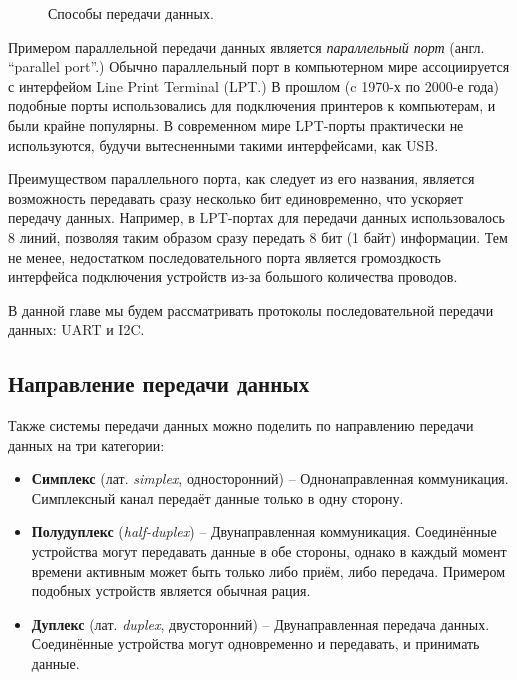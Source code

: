 \documentclass[../sparc.tex]{subfiles}
\begin{document}
\begin{figure}[H]
  \centering
  \caption{Способы передачи данных.}
  \label{fig:communication-data-transfer-categories}
\end{figure}

Примером параллельной передачи данных является \emph{параллельный порт} (англ.
``parallel port''.) Обычно параллельный порт в компьютерном мире ассоциируется с
интерфейом Line Print Terminal (\gls{LPT}.)  В прошлом (c 1970-х по 2000-е года)
подобные порты использовались для подключения принтеров к компьютерам, и были
крайне популярны.  В современном мире LPT-порты практически не используются,
будучи вытесненными такими интерфейсами, как USB.

Преимуществом параллельного порта, как следует из его названия, является
возможность передавать сразу несколько бит единовременно, что ускоряет передачу
данных.  Например, в LPT-портах для передачи данных использовалось 8 линий,
позволяя таким образом сразу передать 8 бит (1 байт) информации.  Тем не менее,
недостатком последовательного порта является громоздкость интерфейса подключения
устройств из-за большого количества проводов.

В данной главе мы будем рассматривать протоколы последовательной передачи
данных: UART и I2C.

\subsection{Направление передачи данных}

Также системы передачи данных можно поделить по направлению передачи данных на
три категории:

\begin{itemize}
\item \textbf{Симплекс} (лат. \emph{simplex}, односторонний) -- Однонаправленная
  коммуникация.  Симплексный канал передаёт данные только в одну сторону.
\item \textbf{Полудуплекс} (\emph{half-duplex}) -- Двунаправленная коммуникация.
  Соединённые устройства могут передавать данные в обе стороны, однако в каждый
  момент времени активным может быть только либо приём, либо передача.  Примером
  подобных устройств является обычная рация.
\item \textbf{Дуплекс} (лат. \emph{duplex}, двусторонний) -- Двунаправленная
  передача данных.  Соединённые устройства могут одновременно и передавать, и
  принимать данные.
\end{itemize}
\end{document}
